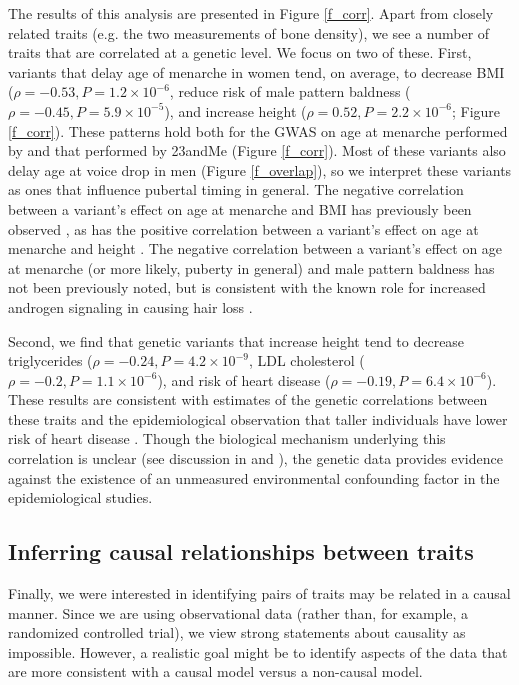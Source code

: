 \documentclass[11pt,titlepage]{article}
\begin{document}
The results of this analysis are presented in Figure \ref{f_corr}. 
Apart from closely related traits (e.g. the two measurements of bone density), we see a number of traits that are correlated at a genetic level.
We focus on two of these. 
First, variants that delay age of menarche in women tend, on average, to decrease BMI ($\rho = -0.53, P = 1.2 \times 10^{-6}$, reduce risk of male pattern baldness ($\rho = -0.45, P = 5.9\times 10^{-5}$), and increase height ($\rho = 0.52, P = 2.2 \times 10^{-6}$; Figure \ref{f_corr}).
These patterns hold both for the GWAS on age at menarche performed by \citet{Perry:2014aa} and that performed by 23andMe (Figure \ref{f_corr}).
Most of these variants also delay age at voice drop in men (Figure \ref{f_overlap}), so we interpret these variants as ones that influence pubertal timing in general. 
The negative correlation between a variant's effect on age at menarche and BMI has previously been observed \citep{Elks:2010aa, Perry:2014aa, bulik2015atlas}, as has the positive correlation between a variant's effect on age at menarche and height \citep{Perry:2014aa, bulik2015atlas}.
The negative correlation between a variant's effect on age at menarche (or more likely, puberty in general) and male pattern baldness has not been previously noted, but is consistent with the known role for increased androgen signaling in causing hair loss \citep{Li:2012aa, Richards:2008aa, HAMILTON:1951aa}. 

Second, we find that genetic variants that increase height tend to decrease triglycerides ($\rho = -0.24, P = 4.2 \times 10^{-9}$, LDL cholesterol ($\rho = -0.2, P = 1.1 \times 10^{-6}$), and risk of heart disease ($\rho = -0.19, P = 6.4\times 10^{-6}$). 
These results are consistent with estimates of the genetic correlations between these traits \citep{bulik2015atlas, Nelson:2015aa} and the epidemiological observation that taller individuals have lower risk of heart disease  \citep{Hebert:1993aa, Paajanen:2010aa, GERTLER:1951aa}. 
Though the biological mechanism underlying this correlation is unclear (see discussion in \citet{Hebert:1993aa} and \citet{Nelson:2015aa}), the genetic data provides evidence against the existence of an unmeasured environmental confounding factor in the epidemiological studies. 

\subsection{Inferring causal relationships between traits}
Finally, we were interested in identifying pairs of traits may be related in a causal manner. 
Since we are using observational data (rather than, for example, a randomized controlled trial), we view strong statements about causality as impossible. 
However, a realistic goal might be to identify aspects of the data that are more consistent with a causal model versus a non-causal model.
\end{document}
